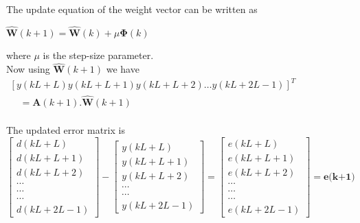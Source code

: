 \documentclass[conference]{IEEEtran}
\begin{document}
The update equation of the weight vector can be written as
\begin{center}
$\hat{\mathbf{W}}(k+1)=\hat{\mathbf{W}}(k)+\mu \mathbf{\Phi}(k)$
\end{center}
where $\mu$ is the step-size parameter.\\
Now using $\hat{\mathbf{W}}(k+1)$ we have\\
$\begin{array}{l}{[y(k L+L) y(k L+L+1) y(k L+L+2) \ldots y(k L+2 L-1)]^{T}} \\ {\quad=\mathbf{A}(k+1) . \hat{\mathbf{W}}(k+1)}\end{array}$\\ \\
The updated error matrix is \\
$\left[ \begin{array}{l}{d(k L+L)} \\ {d(k L+L+1)} \\ {d(k L+L+2)} \\ {\cdots} \\ {\cdots} \\ {\cdots} \\ {d(k L+2 L-1)}\end{array}\right] - \left[ \begin{array}{l}{y(k L+L)} \\ {y(k L+L+1)} \\ {y(k L+L+2)} \\ {\cdots} \\ {\cdots} \\ {y(k L+2 L-1)}\end{array}\right] = \left[ \begin{array}{l}{e(k L+L)} \\ {e(k L+L+1)} \\ {e(k L+L+2)} \\ {\cdots} \\ {\cdots} \\ {\cdots} \\ {e(k L+2 L-1)}\end{array}\right] = \textbf{e(k+1)}$
\end{document}
